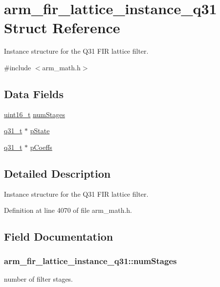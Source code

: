 \hypertarget{structarm__fir__lattice__instance__q31}{\section{arm\-\_\-fir\-\_\-lattice\-\_\-instance\-\_\-q31 Struct Reference}
\label{structarm__fir__lattice__instance__q31}
}


Instance structure for the Q31 F\-I\-R lattice filter.  




{\ttfamily \#include $<$arm\-\_\-math.\-h$>$}

\subsection*{Data Fields}
\begin{DoxyCompactItemize}
\item 
\hyperlink{stdint_8h_a273cf69d639a59973b6019625df33e30}{uint16\-\_\-t} \hyperlink{structarm__fir__lattice__instance__q31_a9f3773bbb76bc5a8a5ee9d37786bf478}{num\-Stages}
\item 
\hyperlink{arm__math_8h_adc89a3547f5324b7b3b95adec3806bc0}{q31\-\_\-t} $\ast$ \hyperlink{structarm__fir__lattice__instance__q31_a08fe9494ab7cd336b791e9657adadcf6}{p\-State}
\item 
\hyperlink{arm__math_8h_adc89a3547f5324b7b3b95adec3806bc0}{q31\-\_\-t} $\ast$ \hyperlink{structarm__fir__lattice__instance__q31_a66c3364bf5863cd45e05f1652c3dc522}{p\-Coeffs}
\end{DoxyCompactItemize}


\subsection{Detailed Description}
Instance structure for the Q31 F\-I\-R lattice filter. 

Definition at line 4070 of file arm\-\_\-math.\-h.



\subsection{Field Documentation}
\hypertarget{structarm__fir__lattice__instance__q31_a9f3773bbb76bc5a8a5ee9d37786bf478}{
\subsubsection[{num\-Stages}]{ arm\-\_\-fir\-\_\-lattice\-\_\-instance\-\_\-q31\-::num\-Stages}}\label{structarm__fir__lattice__instance__q31_a9f3773bbb76bc5a8a5ee9d37786bf478}
number of filter stages. 

